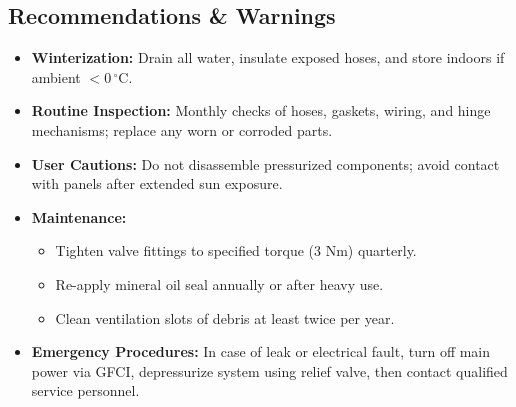\documentclass[12pt]{report}
\begin{document}
\subsection{Recommendations \& Warnings}
\begin{itemize}[leftmargin=1.5cm]
  \item \textbf{Winterization:} Drain all water, insulate exposed hoses, and store indoors if ambient $<0\,^{\circ}\mathrm{C}$.  
  \item \textbf{Routine Inspection:} Monthly checks of hoses, gaskets, wiring, and hinge mechanisms; replace any worn or corroded parts.  
  \item \textbf{User Cautions:} Do not disassemble pressurized components; avoid contact with panels after extended sun exposure.  
  \item \textbf{Maintenance:}
    \begin{itemize}
      \item Tighten valve fittings to specified torque (3 Nm) quarterly.  
      \item Re-apply mineral oil seal annually or after heavy use.  
      \item Clean ventilation slots of debris at least twice per year.  
    \end{itemize}
  \item \textbf{Emergency Procedures:} In case of leak or electrical fault, turn off main power via GFCI, depressurize system using relief valve, then contact qualified service personnel.  
\end{itemize}

\end{document}
